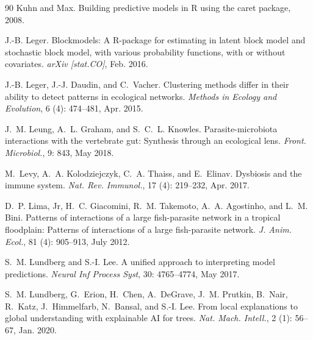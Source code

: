 \documentclass[oneside, a4paper, onecolumn, 11pt]{article}
\begin{document}
\begin{thebibliography}{90}
{Kuhn} and {Max}.
\newblock Building predictive models in {R} using the caret package, 2008.

J.-B. Leger.
\newblock Blockmodels: A {R}-package for estimating in latent block model and stochastic block model, with various probability functions, with or without covariates.
\newblock \emph{arXiv [stat.CO]}, Feb. 2016.

J.-B. Leger, J.-J. Daudin, and C.~Vacher.
\newblock Clustering methods differ in their ability to detect patterns in ecological networks.
\newblock \emph{Methods in Ecology and Evolution}, 6 (4): 474--481, Apr. 2015.

J.~M. Leung, A.~L. Graham, and S.~C.~L. Knowles.
\newblock Parasite-microbiota interactions with the vertebrate gut: Synthesis through an ecological lens.
\newblock \emph{Front. Microbiol.}, 9: 843, May 2018.

M.~Levy, A.~A. Kolodziejczyk, C.~A. Thaiss, and E.~Elinav.
\newblock Dysbiosis and the immune system.
\newblock \emph{Nat. Rev. Immunol.}, 17 (4): 219--232, Apr. 2017.

D.~P. Lima, Jr, H.~C. Giacomini, R.~M. Takemoto, A.~A. Agostinho, and L.~M. Bini.
\newblock Patterns of interactions of a large fish-parasite network in a tropical floodplain: Patterns of interactions of a large fish-parasite network.
\newblock \emph{J. Anim. Ecol.}, 81 (4): 905--913, July 2012.

S.~M. Lundberg and S.-I. Lee.
\newblock A unified approach to interpreting model predictions.
\newblock \emph{Neural Inf Process Syst}, 30: 4765--4774, May 2017.

S.~M. Lundberg, G.~Erion, H.~Chen, A.~DeGrave, J.~M. Prutkin, B.~Nair, R.~Katz, J.~Himmelfarb, N.~Bansal, and S.-I. Lee.
\newblock From local explanations to global understanding with explainable {AI} for trees.
\newblock \emph{Nat. Mach. Intell.}, 2 (1): 56--67, Jan. 2020.


\end{thebibliography}
\end{document}
